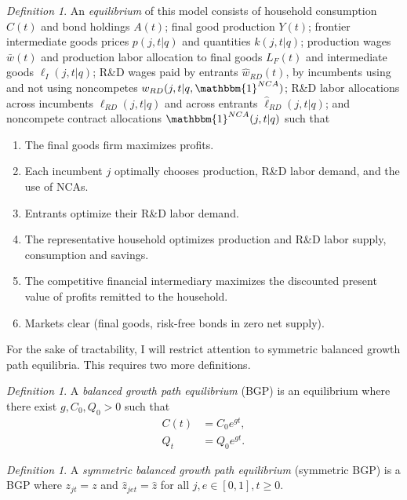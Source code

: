 \documentclass[ecta,nameyear,final]{econsocart}
\theoremstyle{plain}
\theoremstyle{remark}
\newtheorem{definition}[theorem]{Definition}
\begin{document}
\theoremstyle{definition}
\begin{definition}
	An \emph{equilibrium} of this model consists of household consumption $C(t)$ and bond holdings $A(t)$; final good production $Y(t)$; frontier intermediate goods prices $p(j,t|q)$ and quantities $k(j,t|q)$; production wages $\bar{w}(t)$ and production labor allocation to final goods $L_{F}(t)$ and intermediate goods $\ell_I(j,t|q)$; R\&D wages paid by entrants $\hat{w}_{RD}(t)$, by incumbents using and not using noncompetes $w_{RD}(j,t|q,\mathbbm{1}^{NCA})$; R\&D labor allocations across incumbents $\ell_{RD}(j,t|q)$ and across entrants $\hat{\ell}_{RD}(j,t|q)$; and noncompete contract allocations $\mathbbm{1}^{NCA}(j,t|q)$ such that 
	\begin{enumerate}
		\item The final goods firm maximizes profits.
		\item Each incumbent $j$ optimally chooses production, R\&D labor demand, and the use of NCAs.
		\item Entrants optimize their R\&D labor demand.
		\item The representative household optimizes production and R\&D labor supply, consumption and savings.
		\item The competitive financial intermediary maximizes the discounted present value of profits remitted to the household.
		\item Markets clear (final goods, risk-free bonds in zero net supply).
	\end{enumerate}
\end{definition}

For the sake of tractability, I will restrict attention to symmetric balanced growth path equilibria. This requires two more definitions.

\theoremstyle{definition}
\begin{definition}
	A \emph{balanced growth path equilibrium} (BGP) is an equilibrium where there exist $g, C_0, Q_0 > 0$ such that
	\begin{align*}
		C(t) &= C_0 e^{gt}, \\
		Q_t &= Q_0 e^{gt}.
	\end{align*}
\end{definition}

\theoremstyle{definition}
\begin{definition}
	A \emph{symmetric balanced growth path equilibrium} (symmetric BGP) is a BGP where $z_{jt} = z$ and $\hat{z}_{jet} = \hat{z}$ for all $j,e \in [0,1], t \ge 0$. 
\end{definition}
\end{document}
